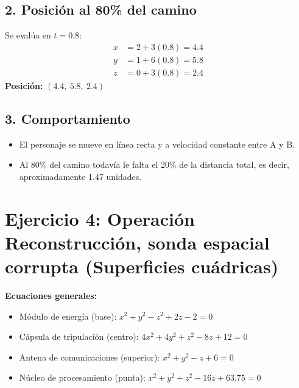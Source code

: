 \documentclass[50pt]{article}
\begin{document}
\subsection*{2. Posición al 80\% del camino}
Se evalúa en $t = 0.8$:
\begin{align*}
x &= 2 + 3(0.8) = 4.4\\
y &= 1 + 6(0.8) = 5.8\\
z &= 0 + 3(0.8) = 2.4
\end{align*}
\textbf{Posición:} $(4.4,\ 5.8,\ 2.4)$
\subsection*{3. Comportamiento }
\begin{itemize}[leftmargin=1.5em]
\item El personaje se mueve en línea recta y a velocidad constante entre A y B.
\item Al 80\% del camino todavía le falta el 20\% de la distancia total, es decir, aproximadamente 1.47 unidades.
\end{itemize}
\newpage
 
\section*{Ejercicio 4: Operación Reconstrucción, sonda espacial corrupta (Superficies cuádricas)}
\noindent\textbf{Ecuaciones generales:}
\begin{itemize}[leftmargin=1.5em]
\item Módulo de energía (base): $x^2 + y^2 - z^2 + 2z - 2 = 0$
\item Cápsula de tripulación (centro): $4x^2 + 4y^2 + z^2 - 8z + 12 = 0$
\item Antena de comunicaciones (superior): $x^2 + y^2 - z + 6 = 0$
\item Núcleo de procesamiento (punta): $x^2 + y^2 + z^2 - 16z + 63.75 = 0$
\end{itemize}
 
\end{document}
